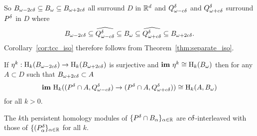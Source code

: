 So $\b\subseteq \B\subseteq \BB$ all surround $D$ in $\R^d$ and $\Q^\of$ and $\QQ^\of$ surround $P^\of$ in $D$ where
\[ \b\subseteq \widehat{\Q^\of}\subseteq \B\subseteq \widehat{\QQ^\of}\subseteq \BB.\]
Corollary~\ref{cor:tcc_iso} therefore follows from Theorem~\ref{thm:separate_iso}.

\begin{corollary}\label{cor:tcc_iso}
  If $\eta^k : \hom_k(\b)\to \hom_k(\BB)$ is surjective and $\im~\eta^k\cong \hom_k(\bb)$ then for any $A\subset D$ such that $\BB\subset A$
  \[ \im~\hom_k((\P\cap A, \Q^\of)\to (\P\cap A, \QQ^\of))\cong \hom_k(A, \bb)\]
  for all $k > 0$.
\end{corollary}

\begin{lemma}\label{lem:ps_inter}
  The $k$th persistent homology modules of $\{\P\cap B_\alpha\}_{\alpha\in\R}$ are $c\of$-interleaved with those of $\{(P_\alpha^\of\}_{\alpha\in\R}$ for all $k$.
\end{lemma}

